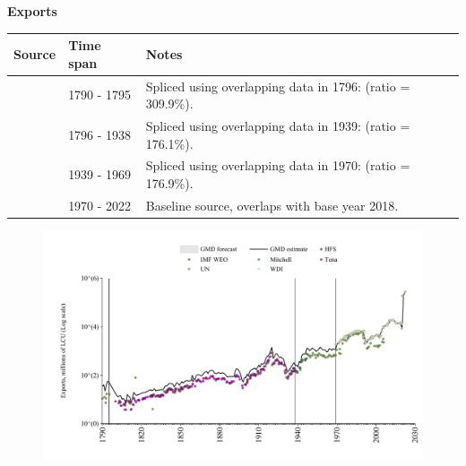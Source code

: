 \documentclass[12pt,a4paper,landscape]{article}
\begin{document}
\begin{adjustbox}{max totalsize={\paperwidth}{\paperheight},center}
\begin{minipage}[t][\textheight][t]{\textwidth}
\vspace*{0.5cm}
{}
\begin{center}
{\Large\bfseries Exports}
\end{center}
\vspace{0.5cm}
\begin{table}[H]
\centering
\small
\begin{tabular}{|l|l|l|}
\hline
\textbf{Source} & \textbf{Time span} & \textbf{Notes} \\
\hline
\rowcolor{white}\cite{Mitchell}& 1790 - 1795 &Spliced using overlapping data in 1796: (ratio = 309.9\%). \\
\rowcolor{lightgray}\cite{Tena}& 1796 - 1938 &Spliced using overlapping data in 1939: (ratio = 176.1\%). \\
\rowcolor{white}\cite{Mitchell}& 1939 - 1969 &Spliced using overlapping data in 1970: (ratio = 176.9\%). \\
\rowcolor{lightgray}\cite{WDI}& 1970 - 2022 &Baseline source, overlaps with base year 2018. \\
\hline
\end{tabular}
\end{table}
\begin{figure}[H]
\centering
\includegraphics[width=\textwidth,height=0.6\textheight,keepaspectratio]{graphs/CUB_exports.pdf}
\end{figure}
\end{minipage}
\end{adjustbox}
\end{document}
